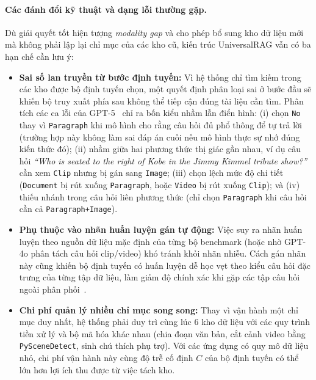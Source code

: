 \paragraph{Các đánh đổi kỹ thuật và dạng lỗi thường gặp.}
Dù giải quyết tốt hiện tượng \textit{modality gap} và cho phép bổ sung kho dữ liệu mới mà không phải lập lại chỉ mục của các kho cũ, kiến trúc UniversalRAG vẫn có ba hạn chế cần lưu ý:
\begin{itemize}
    \item \textbf{Sai số lan truyền từ bước định tuyến:} Vì hệ thống chỉ tìm kiếm trong các kho được bộ định tuyến chọn, một quyết định phân loại sai ở bước đầu sẽ khiến bộ truy xuất phía sau không thể tiếp cận đúng tài liệu cần tìm. Phân tích các ca lỗi của GPT-5~\cite{yeo2026universalrag} chỉ ra bốn kiểu nhầm lẫn điển hình: (i) chọn \texttt{No} thay vì \texttt{Paragraph} khi mô hình cho rằng câu hỏi đủ phổ thông để tự trả lời (trường hợp này không làm sai đáp án cuối nếu mô hình thực sự nhớ đúng kiến thức đó); (ii) nhầm giữa hai phương thức thị giác gần nhau, ví dụ câu hỏi \textit{``Who is seated to the right of Kobe in the Jimmy Kimmel tribute show?''} cần xem \texttt{Clip} nhưng bị gán sang \texttt{Image}; (iii) chọn lệch mức độ chi tiết (\texttt{Document} bị rút xuống \texttt{Paragraph}, hoặc \texttt{Video} bị rút xuống \texttt{Clip}); và (iv) thiếu nhánh trong câu hỏi liên phương thức (chỉ chọn \texttt{Paragraph} khi câu hỏi cần cả \texttt{Paragraph+Image}).
    \item \textbf{Phụ thuộc vào nhãn huấn luyện gán tự động:} Việc suy ra nhãn huấn luyện theo nguồn dữ liệu mặc định của từng bộ benchmark (hoặc nhờ GPT-4o phân tách câu hỏi clip/video) khó tránh khỏi nhãn nhiễu. Cách gán nhãn này cũng khiến bộ định tuyến có huấn luyện dễ học vẹt theo kiểu câu hỏi đặc trưng của từng tập dữ liệu, làm giảm độ chính xác khi gặp các tập câu hỏi ngoài phân phối~\cite{yeo2026universalrag}.
    \item \textbf{Chi phí quản lý nhiều chỉ mục song song:} Thay vì vận hành một chỉ mục duy nhất, hệ thống phải duy trì cùng lúc 6 kho dữ liệu với các quy trình tiền xử lý và bộ mã hóa khác nhau (chia đoạn văn bản, cắt cảnh video bằng \texttt{PySceneDetect}, sinh chú thích phụ trợ). Với các ứng dụng có quy mô dữ liệu nhỏ, chi phí vận hành này cùng độ trễ cố định $C$ của bộ định tuyến có thể lớn hơn lợi ích thu được từ việc tách kho.
\end{itemize}
